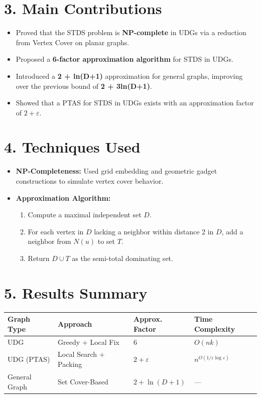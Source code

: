 \documentclass{article}
\begin{document}
\section*{3. Main Contributions}
\begin{itemize}[leftmargin=1.5em]
    \item Proved that the STDS problem is \textbf{NP-complete} in UDGs via a reduction from Vertex Cover on planar graphs.
    \item Proposed a \textbf{6-factor approximation algorithm} for STDS in UDGs.
    \item Introduced a \textbf{2 + ln(D+1)} approximation for general graphs, improving over the previous bound of \textbf{2 + 3ln(D+1)}.
    \item Showed that a PTAS for STDS in UDGs exists with an approximation factor of \( 2 + \varepsilon \).
\end{itemize}

\section*{4. Techniques Used}
\begin{itemize}[leftmargin=1.5em]
    \item \textbf{NP-Completeness:} Used grid embedding and geometric gadget constructions to simulate vertex cover behavior.
    \item \textbf{Approximation Algorithm:}
    \begin{enumerate}
        \item Compute a maximal independent set \( D \).
        \item For each vertex in \( D \) lacking a neighbor within distance 2 in \( D \), add a neighbor from \( N(u) \) to set \( T \).
        \item Return \( D \cup T \) as the semi-total dominating set.
    \end{enumerate}
\end{itemize}

\section*{5. Results Summary}

\begin{tabular}{|l|l|l|l|}
\hline
\textbf{Graph Type} & \textbf{Approach} & \textbf{Approx. Factor} & \textbf{Time Complexity} \\
\hline
UDG & Greedy + Local Fix & 6 & \( O(nk) \) \\
UDG (PTAS) & Local Search + Packing & \( 2 + \varepsilon \) & \( n^{O(1/\varepsilon \log \varepsilon)} \) \\
General Graph & Set Cover-Based & \( 2 + \ln(D + 1) \) & --- \\
\hline
\end{tabular}
\end{document}
